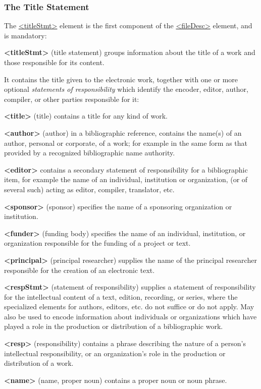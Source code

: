 \subsubsection[{The Title Statement}]{The Title Statement}\label{HD21}\par
The \hyperref[TEI.titleStmt]{<titleStmt>} element is the first component of the \hyperref[TEI.fileDesc]{<fileDesc>} element, and is mandatory: 
\begin{sansreflist}
  
\item [\textbf{<titleStmt>}] (title statement) groups information about the title of a work and those responsible for its content.
\end{sansreflist}
 It contains the title given to the electronic work, together with one or more optional \textit{statements of responsibility} which identify the encoder, editor, author, compiler, or other parties responsible for it: 
\begin{sansreflist}
  
\item [\textbf{<title>}] (title) contains a title for any kind of work.
\item [\textbf{<author>}] (author) in a bibliographic reference, contains the name(s) of an author, personal or corporate, of a work; for example in the same form as that provided by a recognized bibliographic name authority.
\item [\textbf{<editor>}] contains a secondary statement of responsibility for a bibliographic item, for example the name of an individual, institution or organization, (or of several such) acting as editor, compiler, translator, etc.
\item [\textbf{<sponsor>}] (sponsor) specifies the name of a sponsoring organization or institution.
\item [\textbf{<funder>}] (funding body) specifies the name of an individual, institution, or organization responsible for the funding of a project or text.
\item [\textbf{<principal>}] (principal researcher) supplies the name of the principal researcher responsible for the creation of an electronic text.
\item [\textbf{<respStmt>}] (statement of responsibility) supplies a statement of responsibility for the intellectual content of a text, edition, recording, or series, where the specialized elements for authors, editors, etc. do not suffice or do not apply. May also be used to encode information about individuals or organizations which have played a role in the production or distribution of a bibliographic work.
\item [\textbf{<resp>}] (responsibility) contains a phrase describing the nature of a person's intellectual responsibility, or an organization's role in the production or distribution of a work.
\item [\textbf{<name>}] (name, proper noun) contains a proper noun or noun phrase.
\end{sansreflist}
